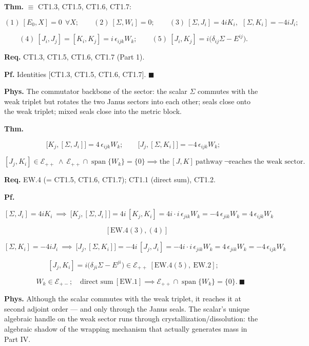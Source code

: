 \begin{theorem}\label{tag:EW-4}
\textbf{Thm.} $\equiv$ CT1.3, CT1.5, CT1.6, CT1.7:

\[
(1)\ [E_0,X]=0\ \ \forall X;\qquad
(2)\ [\Sigma,W_i]=0;\qquad
(3)\ [\Sigma,J_i]=4iK_i,\ \ [\Sigma,K_i]=-4iJ_i;
\]

\[
(4)\ [J_i,J_j]=[K_i,K_j]=i\,\epsilon_{ijk}W_k;\qquad
(5)\ [J_i,K_j]=i\bigl(\delta_{ij}\Sigma-E^{ij}\bigr).
\]

\textbf{Req.} CT1.3, CT1.5, CT1.6, CT1.7 (Part 1).

\textbf{Pf.} Identities [CT1.3, CT1.5, CT1.6, CT1.7]. $\blacksquare$

\textbf{Phys.} The commutator backbone of the sector: the scalar $\Sigma$ commutes with the weak triplet but rotates the two Janus sectors into each other; seals close onto the weak triplet; mixed seals close into the metric block.

\end{theorem}

\begin{theorem}\label{tag:EW-5}
\textbf{Thm.}

\[
\bigl[K_j,[\Sigma,J_i]\bigr]=4\,\epsilon_{ijk}W_k;\qquad
\bigl[J_j,[\Sigma,K_i]\bigr]=-4\,\epsilon_{ijk}W_k;
\]

\[
[J_j,K_i]\in\mathcal E_{++}\ \wedge\ \mathcal E_{++}\cap\operatorname{span}\{W_k\}=\{0\}\implies\text{the}\ [J,K]\ \text{pathway}\ \neg\text{reaches the weak sector}.
\]

\textbf{Req.} EW.4 (= CT1.5, CT1.6, CT1.7); CT1.1 (direct sum), CT1.2.

\textbf{Pf.}

\[
[\Sigma,J_i]=4iK_i\ \implies\ \bigl[K_j,[\Sigma,J_i]\bigr]=4i\,[K_j,K_i]=4i\cdot i\,\epsilon_{jik}W_k=-4\,\epsilon_{jik}W_k=4\,\epsilon_{ijk}W_k
\]

\[
\quad [\mathrm{EW.4}(3),(4)]
\]

\[
[\Sigma,K_i]=-4iJ_i\ \implies\ \bigl[J_j,[\Sigma,K_i]\bigr]=-4i\,[J_j,J_i]=-4i\cdot i\,\epsilon_{jik}W_k=4\,\epsilon_{jik}W_k=-4\,\epsilon_{ijk}W_k
\]

\[
[J_j,K_i]=i\bigl(\delta_{ji}\Sigma-E^{ji}\bigr)\in\mathcal E_{++}\ [\mathrm{EW.4}(5),\ \mathrm{EW.2}];
\]

\[
\qquad W_k\in\mathcal E_{+-};\quad\text{direct sum}\ [\mathrm{EW.1}]\implies\mathcal E_{++}\cap\operatorname{span}\{W_k\}=\{0\}.\ \blacksquare
\]

\textbf{Phys.} Although the scalar commutes with the weak triplet, it reaches it at second adjoint order — and only through the Janus seals. The scalar’s unique algebraic handle on the weak sector runs through crystallization/dissolution: the algebraic shadow of the wrapping mechanism that actually generates mass in Part IV.

\end{theorem}


